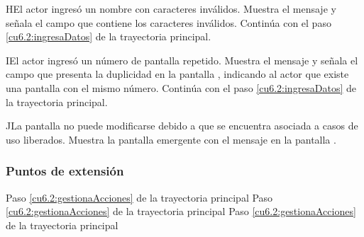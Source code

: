  \begin{UCtrayectoriaA}{H}{El actor ingresó un nombre con caracteres inválidos.}
    \UCpaso[\UCsist] Muestra el mensaje  y señala el campo que contiene los caracteres inválidos.
    \UCpaso[] Continúa con el paso \ref{cu6.2:ingresaDatos} de la trayectoria principal.
 \end{UCtrayectoriaA}
 \begin{UCtrayectoriaA}{I}{El actor ingresó un número de pantalla repetido.}
    \UCpaso[\UCsist] Muestra el mensaje  y señala el campo que presenta la duplicidad en la pantalla 
	    , indicando al actor que existe una pantalla con el mismo número.
    \UCpaso[] Continúa con el paso \ref{cu6.2:ingresaDatos} de la trayectoria principal.
 \end{UCtrayectoriaA}
 \begin{UCtrayectoriaA}{J}{La pantalla no puede modificarse debido a que se encuentra asociada a casos de uso liberados.}
    \UCpaso[\UCsist] Muestra la pantalla emergente con el mensaje  en la pantalla .
 \end{UCtrayectoriaA}

\subsubsection{Puntos de extensión}

	{Paso \ref{cu6.2:gestionaAcciones} de la trayectoria principal}
	{}
	{Paso \ref{cu6.2:gestionaAcciones} de la trayectoria principal}
	{}	
	{Paso \ref{cu6.2:gestionaAcciones} de la trayectoria principal}
	{}